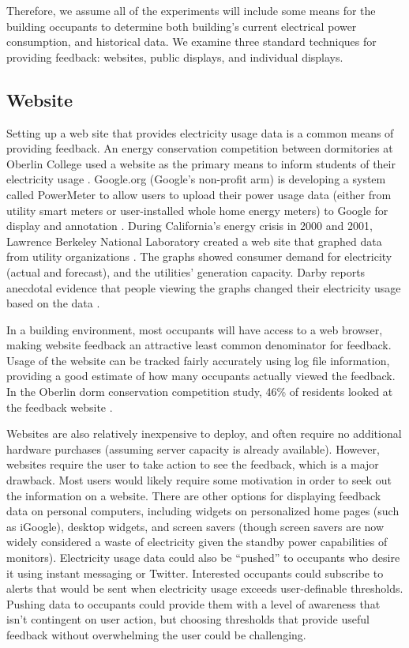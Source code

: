 \documentclass[11pt]{article}
\begin{document}
Therefore, we assume all of the experiments will include some means for the building occupants to determine both building's current electrical power consumption, and historical data. We examine three standard techniques for providing feedback: websites, public displays, and individual displays.

\subsection{Website}
\label{sec:website}

Setting up a web site that provides electricity usage data is a common means of providing feedback. An energy conservation competition between dormitories at Oberlin College used a website as the primary means to inform students of their electricity usage \cite{petersen-dorm-energy-reduction}. Google.org (Google's non-profit arm) is developing a system called PowerMeter to allow users to upload their power usage data (either from utility smart meters or user-installed whole home energy meters) to Google for display and annotation \cite{Google-PowerMeter}. During California's energy crisis in 2000 and 2001, Lawrence Berkeley National Laboratory created a web site that graphed data from utility organizations \cite{Bartholomew2008Current-Energy}. The graphs showed consumer demand for electricity (actual and forecast), and the utilities' generation capacity. Darby reports anecdotal evidence that people viewing the graphs changed their electricity usage based on the data \cite{darby-review-2006}.

In a building environment, most occupants will have access to a web browser, making website feedback an attractive least common denominator for feedback. Usage of the website can be tracked fairly accurately using log file information, providing a good estimate of how many occupants actually viewed the feedback. In the Oberlin dorm conservation competition study, 46\% of residents looked at the feedback website \cite{petersen-dorm-energy-reduction}.

Websites are also relatively inexpensive to deploy, and often require no additional hardware purchases (assuming server capacity is already available). However, websites require the user to take action to see the feedback, which is a major drawback. Most users would likely require some motivation in order to seek out the information on a website. There are other options for displaying feedback data on personal computers, including widgets on personalized home pages (such as iGoogle), desktop widgets, and screen savers (though screen savers are now widely considered a waste of electricity given the standby power capabilities of monitors). Electricity usage data could also be ``pushed'' to occupants who desire it using instant messaging or Twitter. Interested occupants could subscribe to alerts that would be sent when electricity usage exceeds user-definable thresholds. Pushing data to occupants could provide them with a level of awareness that isn't contingent on user action, but choosing thresholds that provide useful feedback without overwhelming the user could be challenging.
\end{document}
